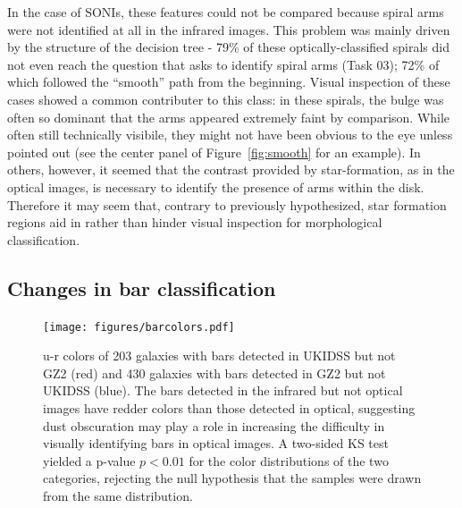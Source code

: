 In the case of SONIs, these features could not be compared because spiral arms were not identified at all in the infrared images. This problem was mainly driven by the structure of the decision tree - 79\% of these optically-classified spirals did not even reach the question that asks to identify spiral arms (Task 03); 72\% of which followed the ``smooth'' path from the beginning. Visual inspection of these cases showed a common contributer to this class: in these spirals, the bulge was often so dominant that the arms appeared extremely faint by comparison. While often still technically visibile, they might not have been obvious to the eye unless pointed out (see the center panel of Figure~\ref{fig:smooth} for an example). In others, however, it seemed that the contrast provided by star-formation, as in the optical images, is necessary to identify the presence of arms within the disk. Therefore it may seem that, contrary to previously hypothesized, star formation regions aid in rather than hinder visual inspection for morphological classification.

\subsection{Changes in bar classification}
\begin{figure}
\centering
\texttt{[image: figures/barcolors.pdf]}
\caption{u-r colors of 203 galaxies with bars detected in UKIDSS but not GZ2 (red) and 430 galaxies with bars detected in GZ2 but not UKIDSS (blue). The bars detected in the infrared but not optical images have redder colors than those detected in optical, suggesting dust obscuration may play a role in increasing the difficulty in visually identifying bars in optical images. A two-sided KS test yielded a p-value $p < 0.01$ for the color distributions of the two categories, rejecting the null hypothesis that the samples were drawn from the same distribution. }
\label{fig:colorbar}
\end{figure}

